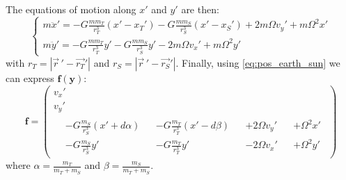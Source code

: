 The equations of motion along \(x'\) and \(y'\) are then:
\begin{equation}
    \begin{cases}
        m \ddot x' = -G \frac{m m_T}{r_T^3} (x' - x_T')
        - G \frac{m m_S}{r_S^3} (x' - x_S')
        + 2 m \Omega v_y'
        + m \Omega^2 x' \\
        m \ddot y' = -G \frac{m m_T}{r_T^3} y'
        - G \frac{m m_S}{r_S^3} y'
        - 2 m \Omega v_x'
        + m \Omega^2 y'
    \end{cases}
\end{equation}
with \(r_T = |\vec{r}\,' - \vec{r_T}'|\) and \(r_S = |\vec{r}\,' - \vec{r_S}'|\). Finally, using \autoref{eq:pos_earth_sun} we can express \(\mathbf f(\mathbf y)\):
\begin{equation}
    \mathbf f = \left(\begin{gathered}
        v_x' \\
        v_y' \\
        \begin{aligned}
            &-G \frac{m_S}{r_S^3} (x' + d \alpha) &&- G \frac{m_T}{r_T^3} (x' - d \beta) &&+ 2 \Omega v_y' &&+ \Omega^2 x' \\
            &-G \frac{m_S}{r_S^3} y' &&-G \frac{m_T}{r_T^3} y' &&- 2 \Omega v_x' &&+ \Omega^2 y'
        \end{aligned}
    \end{gathered}\right)
\end{equation}
where \(\alpha = \frac{m_T}{m_T + m_S}\) and \(\beta = \frac{m_S}{m_T + m_S}\).

